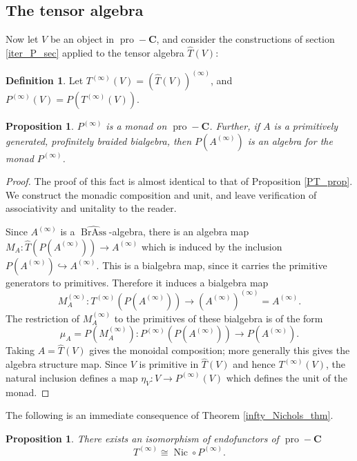 \documentclass[12pt]{article}
\DeclareMathOperator{\Nic}{Nic}
\DeclareMathOperator{\pro}{pro}
\DeclareMathOperator{\BrAss}{BrAss}
\newcommand{\BrAsshat}{\widehat{\BrAss}} %
\newcommand{\That}{\widehat{T}}
\newcommand{\bC} {\mathbf{C}}
\newcommand{\proC}{\pro\!-\bC}
\theoremstyle{plain}
\newtheorem{prop}[thm]{Proposition}
\theoremstyle{definition}
\newtheorem{defn}[thm]{Definition}
\theoremstyle{remark}
\begin{document}
\subsection{The tensor algebra}

Now let $V$ be an object in $\proC$, and consider the constructions of section \ref{iter_P_sec} applied to the tensor algebra $\That(V)$:

\begin{defn} Let $T^{(\infty)}(V) = (\That(V))^{(\infty)}$, and $P^{(\infty)}(V) = P(T^{(\infty)}(V))$.
\end{defn}

\begin{prop}

$P^{(\infty)}$ is a monad on $\proC$.  Further, if $A$ is a primitively generated, profinitely braided bialgebra, then $P(A^{(\infty)})$ is an algebra for the monad $P^{(\infty)}$.

\end{prop}

\begin{proof}

The proof of this fact is almost identical to that of Proposition \ref{PT_prop}.  We construct the monadic composition and unit, and leave verification of associativity and unitality to the reader. 

Since $A^{(\infty)}$ is a $\BrAsshat$-algebra, there is an algebra map $M_A: \That(P(A^{(\infty)})) \to A^{(\infty)}$ which is induced by the inclusion $P(A^{(\infty)}) \hookrightarrow A^{(\infty)}$.  This is a bialgebra map, since it carries the primitive generators to primitives.  Therefore it induces a bialgebra map 
%
$$M_A^{(\infty)}: T^{(\infty)}(P(A^{(\infty)})) \to (A^{(\infty)})^{(\infty)} = A^{(\infty)}.$$
%
The restriction of $M_A^{(\infty)}$ to the primitives of these bialgebra is of the form
%
$$\mu_A = P(M_A^{(\infty)}): P^{(\infty)}(P(A^{(\infty)})) \to P(A^{(\infty)}).$$
%
Taking $A = \That(V)$ gives the monoidal composition; more generally this gives the algebra structure map.  Since $V$ is primitive in $\That(V)$ and hence $T^{(\infty)}(V)$, the natural inclusion defines a map $\eta_V: V \to P^{(\infty)}(V)$ which defines the unit of the monad.

\end{proof} 

The following is an immediate consequence of Theorem \ref{infty_Nichols_thm}.

\begin{prop} There exists an isomorphism of endofunctors of $\proC$
%
$$T^{(\infty)} \cong \Nic \circ P^{(\infty)}.$$
%
\end{prop}
\end{document}
